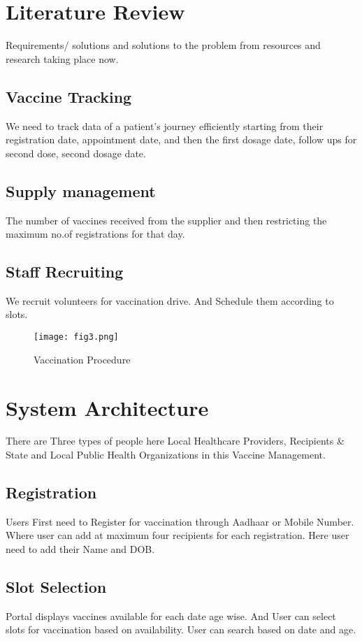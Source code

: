\documentclass[conference]{IEEEtran}
\begin{document}
\section{Literature Review}
Requirements/ solutions and solutions to the problem from resources and research taking place now.
\subsection{Vaccine Tracking}
We need to track data of a patient’s journey efficiently starting from their registration date, appointment date, and then the first dosage date, follow ups for second dose, second dosage date.
\subsection{Supply management}
The number of vaccines received from the supplier and then restricting the maximum no.of registrations for that day.
\subsection{Staff Recruiting}
We recruit volunteers for vaccination drive. And Schedule them according to slots.

\begin{figure}[htbp]
\centerline{\texttt{[image: fig3.png]}}
\caption{Vaccination Procedure}
\label{fig3}
\end{figure}

\section{System Architecture}
There are Three types of people here Local Healthcare Providers, Recipients \& State and Local Public Health Organizations in this Vaccine Management.
\subsection{Registration}
Users First need to Register for vaccination through Aadhaar or Mobile Number. Where user can add at maximum four recipients for each registration. Here user need to add their Name and DOB.

\subsection{Slot Selection}
Portal displays vaccines available for each date age wise. And User can select slots for vaccination based on availability. User can search based on date and age.
\end{document}
